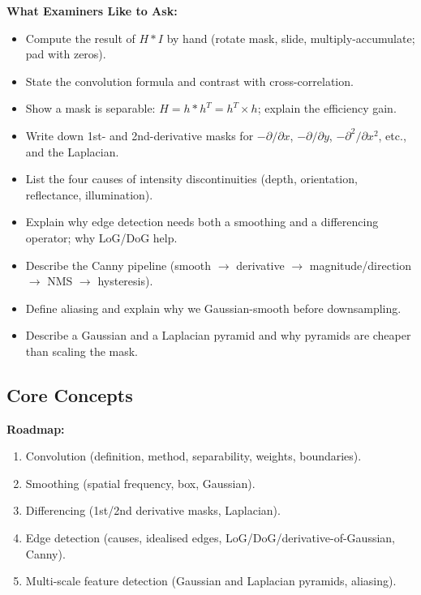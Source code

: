 \separator

\textbf{What Examiners Like to Ask:}
\begin{itemize}
  \item Compute the result of $H \ast I$ by hand (rotate mask, slide, multiply-accumulate; pad with zeros).
  \item State the convolution formula and contrast with cross-correlation.
  \item Show a mask is separable: $H = h \ast h^T = h^T \times h$; explain the efficiency gain.
  \item Write down 1st- and 2nd-derivative masks for $-\partial/\partial x$, $-\partial/\partial y$, $-\partial^2/\partial x^2$, etc., and the Laplacian.
  \item List the four causes of intensity discontinuities (depth, orientation, reflectance, illumination).
  \item Explain why edge detection needs both a smoothing and a differencing operator; why LoG/DoG help.
  \item Describe the Canny pipeline (smooth $\to$ derivative $\to$ magnitude/direction $\to$ NMS $\to$ hysteresis).
  \item Define aliasing and explain why we Gaussian-smooth before downsampling.
  \item Describe a Gaussian and a Laplacian pyramid and why pyramids are cheaper than scaling the mask.
\end{itemize}

\subsection{Core Concepts}

\textbf{Roadmap:}
\begin{enumerate}
  \item Convolution (definition, method, separability, weights, boundaries).
  \item Smoothing (spatial frequency, box, Gaussian).
  \item Differencing (1st/2nd derivative masks, Laplacian).
  \item Edge detection (causes, idealised edges, LoG/DoG/derivative-of-Gaussian, Canny).
  \item Multi-scale feature detection (Gaussian and Laplacian pyramids, aliasing).
\end{enumerate}

\bigseparator

